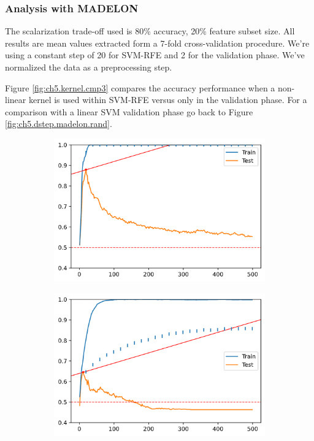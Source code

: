 \subsubsection*{Analysis with MADELON}

The scalarization trade-off used is 80\% accuracy, 20\% feature subset size. All results are mean values extracted form a 7-fold cross-validation procedure. We're using a constant step of 20 for SVM-RFE and 2 for the validation phase. We've normalized the data as a preprocessing step.

Figure \ref{fig:ch5.kernel.cmp3} compares the accuracy performance when a non-linear kernel is used within SVM-RFE versus only in the validation phase. For a comparison with a linear SVM validation phase go back to Figure \ref{fig:ch5.dstep.madelon.rand}.

\begin{figure}[H]
    \centering
    \begin{subfigure}[b]{0.32\linewidth}
        \includegraphics[width=\linewidth]{img/ch5/kernel/mad-t-poly.png}
    \end{subfigure}
    \begin{subfigure}[b]{0.32\linewidth}
        \includegraphics[width=\linewidth]{img/ch5/kernel/mad-t-poly2.png}

\end{subfigure}
\end{figure}
